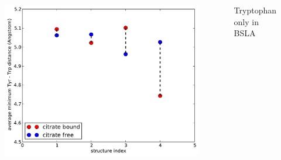 \documentclass[english]{beamer}
\begin{document}
\begin{frame}
\begin{columns}[t]
        \begin{figure}
            \includegraphics[width=1.0\textwidth]{figures/TyrTrp/average_mindist_TyrTrp.pdf}
        \end{figure}      

        \centering
        Tryptophan only in BSLA

    \end{columns}    

    \vfill

    \vspace{2ex}
    \tiny
 
\end{frame}        

\end{document}

